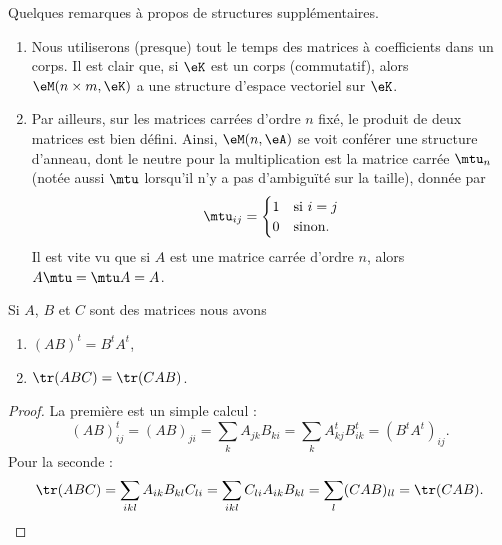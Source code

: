 \begin{remark}
    Quelques remarques à propos de structures supplémentaires.
\begin{enumerate}
    \item Nous utiliserons (presque) tout le temps des matrices à coefficients dans un corps. Il est clair que, si \( \eK \) est un corps (commutatif), alors \( \eM(n\times m,\eK) \) a une structure d'espace vectoriel sur \( \eK \).
    \item Par ailleurs, sur les matrices carrées d'ordre \( n \) fixé, le produit de deux matrices est bien défini. Ainsi, \( \eM(n,\eA)\) se voit conférer une structure d'anneau, dont le neutre pour la multiplication est la matrice carrée \( \mtu_n\) (notée aussi \( \mtu\) lorsqu'il n'y a pas d'ambiguïté sur la taille), donnée par
\begin{equation}
    \mtu_{ij}=\begin{cases}
        1    &   \text{si } i=j\\
        0    &    \text{sinon.}
    \end{cases}
\end{equation}
Il est vite vu que si \( A\) est une matrice carrée d'ordre \( n \), alors \( A\mtu=\mtu A=A\).
\end{enumerate}
\end{remark}

\begin{lemma}        \label{LEMooUXDRooWZbMVN}
    Si \( A\), \( B\) et \( C\) sont des matrices nous avons
    \begin{enumerate}
        \item
            \( (AB)^t=B^tA^t\),
        \item       \label{ITEMooXDYQooAlnArd}
            \( \tr(ABC)=\tr(CAB)\).
    \end{enumerate}
\end{lemma}

\begin{proof}
    La première est un simple calcul :
    \begin{equation}
        (AB)^t_{ij}=(AB)_{ji}=\sum_kA_{jk}B_{ki}=\sum_kA^t_{kj}B^t_{ik}=(B^tA^t)_{ij}.
    \end{equation}
    Pour la seconde :
    \begin{equation}
        \tr(ABC)=\sum_{ikl}A_{ik}B_{kl}C_{li}=\sum_{ikl}C_{li}A_{ik}B_{kl}=\sum_l(CAB)_{ll}=\tr(CAB).
    \end{equation}
\end{proof}

